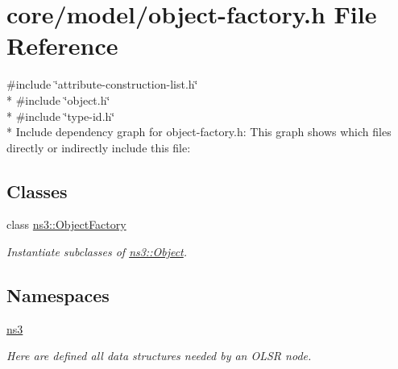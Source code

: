 \hypertarget{object-factory_8h}{}\section{core/model/object-\/factory.h File Reference}
\label{object-factory_8h}
{\ttfamily \#include \char`\"{}attribute-\/construction-\/list.\+h\char`\"{}}\\*
{\ttfamily \#include \char`\"{}object.\+h\char`\"{}}\\*
{\ttfamily \#include \char`\"{}type-\/id.\+h\char`\"{}}\\*
Include dependency graph for object-\/factory.h\+:
This graph shows which files directly or indirectly include this file\+:
\subsection*{Classes}
\begin{DoxyCompactItemize}
\item 
class \hyperlink{classns3_1_1ObjectFactory}{ns3\+::\+Object\+Factory}
\begin{DoxyCompactList}\small\item\em Instantiate subclasses of \hyperlink{classns3_1_1Object}{ns3\+::\+Object}. \end{DoxyCompactList}\end{DoxyCompactItemize}
\subsection*{Namespaces}
\begin{DoxyCompactItemize}
\item 
 \hyperlink{namespacens3}{ns3}
\begin{DoxyCompactList}\small\item\em Here are defined all data structures needed by an O\+L\+SR node. \end{DoxyCompactList}\end{DoxyCompactItemize}
